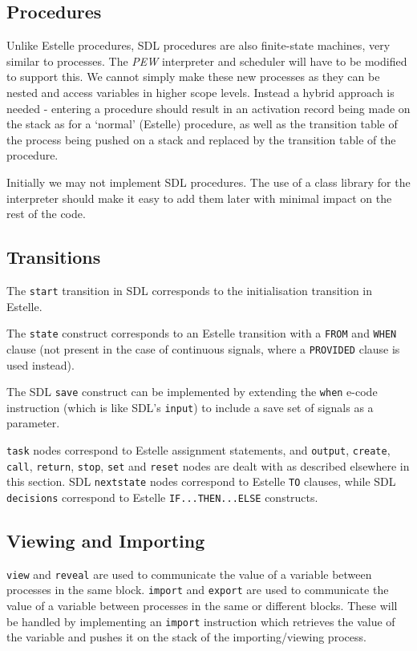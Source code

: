\subsection{Procedures}
\label{sdlproc}

Unlike Estelle procedures, SDL procedures are also finite-state
machines, very similar to processes.
The {\em PEW} interpreter and
scheduler will have to be modified to support this.
We cannot simply make these new processes as they can be nested
and access variables in higher scope levels. 
Instead a hybrid approach is needed - entering a procedure 
should result in an activation record being made on the stack
as for a `normal' (Estelle) procedure, as well as the transition
table of the process being pushed on a stack and replaced by the
transition table of the procedure.

Initially we may not implement SDL procedures. 
The use of a class library for the interpreter should make it
easy to add them later with minimal impact on the rest of the code.

\subsection{Transitions}

The {\tt start} transition in SDL corresponds to the initialisation
transition in Estelle.

The {\tt state} construct corresponds to an Estelle transition with a
{\tt FROM} and {\tt WHEN} clause (not present in the case of
continuous signals, where a {\tt PROVIDED} clause is used instead).

The SDL {\tt save} construct can be implemented by extending the
{\tt when} e-code instruction (which is like SDL's {\tt input})
to include a save set of signals as a parameter.

{\tt task} nodes correspond to Estelle assignment statements,
and {\tt output}, {\tt create}, {\tt call}, {\tt return},
{\tt stop}, {\tt set} and {\tt reset} nodes are dealt with as
described elsewhere in this section. 
SDL {\tt nextstate} nodes correspond to Estelle {\tt TO} clauses,
while SDL {\tt decisions} correspond to Estelle {\tt IF...THEN...ELSE}
constructs.

\subsection{Viewing and Importing}

{\tt view} and {\tt reveal} are used to communicate the value of
a variable between processes in the same block.
{\tt import} and {\tt export} are used to communicate the value
of a variable between processes in the same or different blocks.
These will be handled by implementing an {\tt import} instruction
which retrieves the value of the variable and pushes it on the stack
of the importing/viewing process.

